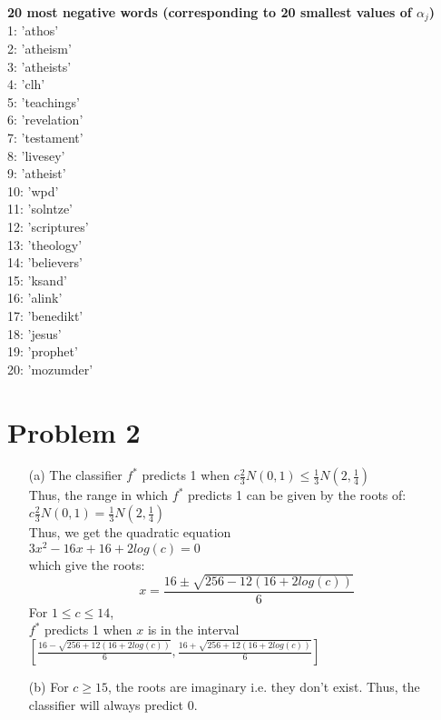 \documentclass[fleqn]{article}
\begin{document}
\begin{itemize}
                \textbf{20 most negative words (corresponding to 20 smallest values of $\alpha_j$)}\\
                1: 'athos'\\
                2: 'atheism'\\
                3: 'atheists'\\
                4: 'clh'\\
                5: 'teachings'\\
                6: 'revelation'\\
                7: 'testament'\\
                8: 'livesey'\\
                9: 'atheist'\\
                10: 'wpd'\\
                11: 'solntze'\\
                12: 'scriptures'\\
                13: 'theology'\\
                14: 'believers'\\
                15: 'ksand'\\
                16: 'alink'\\
                17: 'benedikt'\\
                18: 'jesus'\\
                19: 'prophet'\\
                20: 'mozumder'\\
\end{itemize}
\section{Problem 2}{}
\begin{itemize}
	\item[(a)] The classifier $f^*$ predicts 1 when $c \frac{2}{3}N(0,1) \leq \frac{1}{3}N(2, \frac{1}{4})$\\
		Thus, the range in which $f^*$ predicts 1 can be given by the roots of:\\
		$c \frac{2}{3}N(0,1) = \frac{1}{3}N(2, \frac{1}{4})$\\
		Thus, we get the quadratic equation\\
		$3x^2 - 16x + 16 + 2log(c) = 0$\\
		which give the roots:\\
		\[ x = \frac{16 \pm \sqrt{256 - 12(16 + 2log(c))}}{6} \]
		For $1 \leq c \leq 14$,\\
		$f^*$ predicts 1 when $x$ is in the interval $[\frac{16 - \sqrt{256 + 12(16 + 2log(c))}}{6}, \frac{16 + \sqrt{256 + 12(16 + 2log(c))}}{6}]$\\

        \item[(b)] 
		For $c \geq 15$, the roots are imaginary i.e. they don't exist. Thus, the classifier will always predict 0.\\
\end{itemize}
\end{document}
